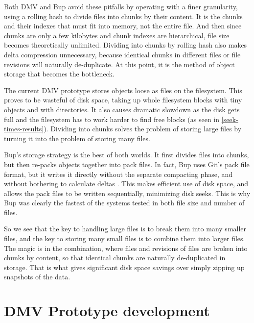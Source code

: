 Both \gls{DMV} and Bup avoid these pitfalls by operating with a finer
granularity, using a rolling hash to divide files into chunks by their content.
It is the chunks and their indexes that must fit into memory, not the entire
file. And then since chunks are only a few kilobytes and chunk indexes are
hierarchical, file size becomes theoretically unlimited. Dividing into chunks by
rolling hash also makes delta compression unnecessary, because identical chunks
in different files or file revisions will naturally de-duplicate. At this point,
it is the method of object storage that becomes the bottleneck.

The current \gls{DMV} prototype stores objects loose as files on the filesystem.
This proves to be wasteful of disk space, taking up whole filesystem blocks with
tiny objects and with directories. It also causes dramatic slowdown as the disk
gets full and the filesystem has to work harder to find free blocks (as seen in
\autoref{seek-times-results}). Dividing into chunks solves the problem of
storing large files by turning it into the problem of storing many files.

Bup's storage strategy is the best of both worlds. It first divides files into
chunks, but then re-packs objects together into pack files. In fact, Bup uses
Git's pack file format\footnotemark, but it writes it directly without the
separate compacting phase, and without bothering to calculate deltas
\cite{bup_design}. This makes efficient use of disk space, and allows the pack
files to be written sequentially, minimizing disk seeks. This is why Bup was
clearly the fastest of the systems tested in both file size and number of files.


So we see that the key to handling large files is to break them into many
smaller files, and the key to storing many small files is to combine them into
larger files. The magic is in the combination, where files and revisions of
files are broken into chunks by content, so that identical chunks are naturally
de-duplicated in storage. That is what gives significant disk space savings over
simply zipping up snapshots of the data.

%



\section{DMV Prototype development}

